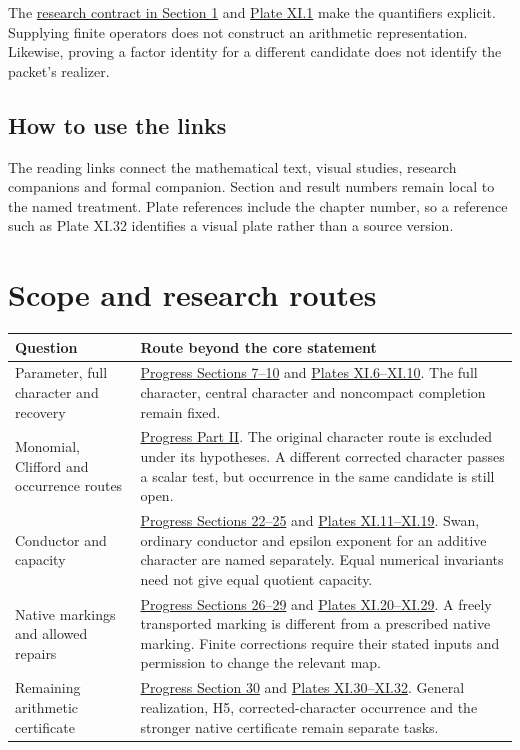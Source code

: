 The \href{https://komorebi.invalid/b07/contract}{research contract in Section 1} and \href{https://komorebi.invalid/b07/contract_atlas}{Plate XI.1} make the quantifiers explicit. Supplying finite operators does not construct an arithmetic representation. Likewise, proving a factor identity for a different candidate does not identify the packet's realizer.

\subsection*{How to use the links}
The reading links connect the mathematical text, visual studies, research companions and formal companion. Section and result numbers remain local to the named treatment. Plate references include the chapter number, so a reference such as Plate XI.32 identifies a visual plate rather than a source version.
\clearpage
\section*{Scope and research routes}
{}
\begin{tabular}{@{}>{\raggedright\arraybackslash}p{.32\linewidth}>{\raggedright\arraybackslash}p{.63\linewidth}@{}}\toprule
Question & Route beyond the core statement\\\midrule
Parameter, full character and recovery & \href{https://komorebi.invalid/b07/arithmetic}{Progress Sections 7--10} and \href{https://komorebi.invalid/b07/arithmetic_atlas}{Plates XI.6--XI.10}. The full character, central character and noncompact completion remain fixed.\\[8pt]
Monomial, Clifford and occurrence routes & \href{https://komorebi.invalid/b07/monomial}{Progress Part II}. The original character route is excluded under its hypotheses. A different corrected character passes a scalar test, but occurrence in the same candidate is still open.\\[8pt]
Conductor and capacity & \href{https://komorebi.invalid/b07/conductor}{Progress Sections 22--25} and \href{https://komorebi.invalid/b07/conductor_atlas}{Plates XI.11--XI.19}. Swan, ordinary conductor and epsilon exponent for an additive character are named separately. Equal numerical invariants need not give equal quotient capacity.\\[8pt]
Native markings and allowed repairs & \href{https://komorebi.invalid/b07/markings}{Progress Sections 26--29} and \href{https://komorebi.invalid/b07/markings_atlas}{Plates XI.20--XI.29}. A freely transported marking is different from a prescribed native marking. Finite corrections require their stated inputs and permission to change the relevant map.\\[8pt]
Remaining arithmetic certificate & \href{https://komorebi.invalid/b07/remaining}{Progress Section 30} and \href{https://komorebi.invalid/b07/remaining_atlas}{Plates XI.30--XI.32}. General realization, H5, corrected-character occurrence and the stronger native certificate remain separate tasks.\\\bottomrule
\end{tabular}

